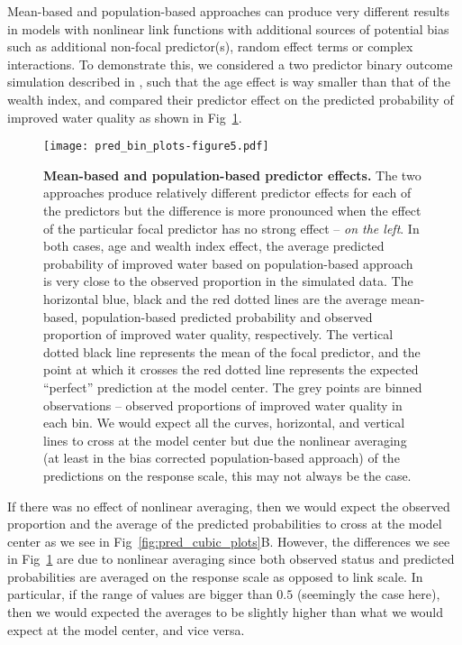 \documentclass[10pt,letterpaper]{article}
\begin{document}
Mean-based and population-based approaches can produce very different results in models with nonlinear link functions with additional sources of potential bias such as additional non-focal predictor(s), random effect terms or complex interactions. To demonstrate this, we considered a two predictor binary outcome simulation described in , such that the age effect is way smaller than that of the wealth index, and compared their predictor effect on the predicted probability of improved water quality as shown in Fig~\ref{fig:pred_bin_plots}. 

\begin{figure}[!h]
\centering
\texttt{[image: pred\_bin\_plots-figure5.pdf]}
\caption{{\bf Mean-based and population-based predictor effects.} The two approaches produce relatively different predictor effects for each of the predictors but the difference is more pronounced when the effect of the particular focal predictor has no strong effect -- \emph{on the left}. In both cases, age and wealth index effect, the average predicted probability of improved water based on population-based approach is very close to the observed proportion in the simulated data. The horizontal blue, black and the red dotted lines are the average mean-based, population-based predicted probability and observed proportion of improved water quality, respectively. The vertical dotted black line represents the mean of the focal predictor, and the point at which it crosses the red dotted line represents the expected ``perfect'' prediction at the model center. The grey points are binned observations -- observed proportions of improved water quality in each bin. We would expect all the curves, horizontal, and vertical lines to cross at the model center but due the nonlinear averaging (at least in the bias corrected population-based approach) of the predictions on the response scale, this may not always be the case.} 
\label{fig:pred_bin_plots}
\end{figure}

If there was no effect of nonlinear averaging, then we would expect the observed proportion and the average of the predicted probabilities to cross at the model center as we see in Fig~\ref{fig:pred_cubic_plots}B. However, the differences we see in Fig~\ref{fig:pred_bin_plots} are due to nonlinear averaging since both observed status and predicted probabilities are averaged on the response scale as opposed to link scale. In particular, if the range of values are bigger than $0.5$ (seemingly the case here), then we would expected the averages to be slightly higher than what we would expect at the model center, and vice versa.
\end{document}
